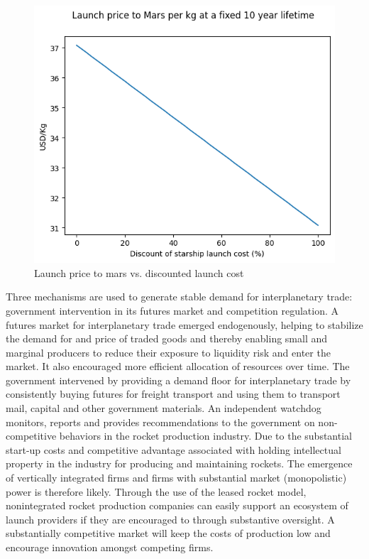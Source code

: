 \documentclass[fleqn,10pt]{Stylesheet} %
\begin{document}
\begin{figure}
    \centering
    \includegraphics[width=\linewidth]{fig_disclaunchflights.png}
    \caption{Launch price to mars vs. discounted launch cost}
    \label{fig:flight_cost_launch}
\end{figure}

Three mechanisms are used to generate stable demand for interplanetary trade: government intervention in its futures market and competition regulation. A futures market for interplanetary trade emerged endogenously, helping to stabilize the demand for and price of traded goods and thereby enabling small and marginal producers to reduce their exposure to liquidity risk and enter the market. It also encouraged more efficient allocation of resources over time. The government intervened by providing a demand floor for interplanetary trade by consistently buying futures for freight transport and using them to transport mail, capital and other government materials. An independent watchdog monitors, reports and provides recommendations to the government on non-competitive behaviors in the rocket production industry. Due to the substantial start-up costs and competitive advantage associated with holding intellectual property in the industry for producing and maintaining rockets. The emergence of vertically integrated firms and firms with substantial market (monopolistic) power is therefore likely. Through the use of the leased rocket model, nonintegrated rocket production companies can easily support an ecosystem of launch providers if they are encouraged to through substantive oversight. A substantially competitive market will keep the costs of production low and encourage innovation amongst competing firms.
\end{document}
